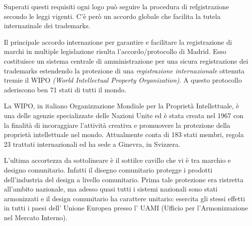 Superati questi requisiti ogni logo può seguire la procedura di refgistrazione secondo le leggi vigenti. C'è però un accordo globale che facilita la tutela internazinale dei trademarks.

Il principale accordo internazione per garantire e facilitare la registrazione di marchi in multiple legislazione risulta l'accordo/protocollo di Madrid. Esso costituisce un sistema centrale di amministrazione per una sicura registrazione dei trademarks estendendo la protezione di una \textit{registrazione internazionale} ottenuta tremie il WIPO \textit{(World Intellectual Property Organization)}. A questo protocollo aderiscono ben 71 stati di tutti il mondo.

La WIPO, in italiano Organizzazione Mondiale per la Proprietà Intellettuale, è una delle agenzie specializzate delle Nazioni Unite ed è stata creata nel 1967 con la finalità di incoraggiare l'attività creativa e promuovere la protezione della proprietà intellettuale nel mondo. Attualmente conta di 183 stati membri, regola 23 trattati internazionali ed ha sede a Ginevra, in Svizzera.

L'ultima accortezza da sottolineare è il sottilce cavillo che vi è tra marchio e designo comunitario. Infatti il disegno comunitario protegge i prodotti dell'industria del design a livello comunitario. Prima tale protezione era ristretta all'ambito nazionale, ma adesso quasi tutti i sistemi nazionali sono stati armonizzati e il design comunitario ha carattere unitario: esercita gli stessi effetti in tutti i paesi dell' Unione Europea presso l' UAMI (Ufficio per l'Armonizzazione nel Mercato Interno).

